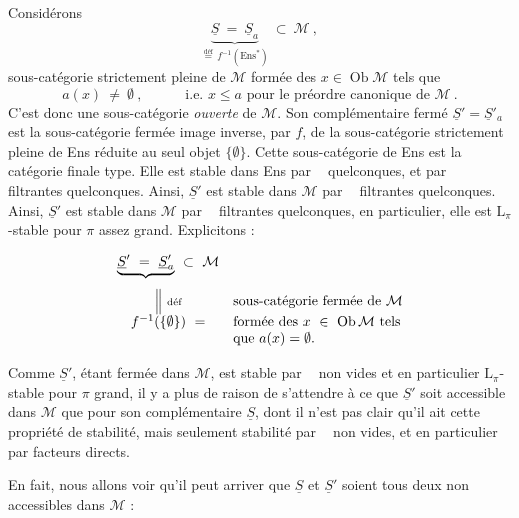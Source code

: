 \documentclass[11pt]{article}
\newcommand{\msp}[1]{\marginpar{\footnotesize [#1]}}
\newcommand{\limind}{\mathop{\underrightarrow{\mathrm{lim}}}}
\newcommand{\limproj}{\mathop{\underleftarrow{\mathrm{lim}}}}
\begin{document}
Considérons
\[
\underbrace{\underline{S}\ =\ \underline{S}_a}_{\overset{\text{déf}}{=}\,f^{-1}(\mathrm{Ens}^*)}\ \subset\ \mathcal{M}\ ,
\]
sous-catégorie strictement pleine de $\mathcal{M}$ formée des $x\in\operatorname{Ob}\mathcal{M}$ tels que
\[
a(x)\ \neq\ \emptyset\ ,\qquad\quad \text{i.e. } x\leqslant a \text{ pour le préordre canonique de } \mathcal{M}\ .
\]
C'est donc une sous-catégorie \textit{ouverte} de $\mathcal{M}$. Son complémentaire fermé $\underline{S}'=\underline{S}'_a$ est la sous-catégorie fermée image inverse, par $f$, de la sous-catégorie strictement pleine de Ens réduite au seul objet $\{\emptyset\}$. Cette sous-catégorie de Ens est la catégorie finale type. Elle est stable dans Ens par $\limind$ quelconques, et par $\limproj$ filtrantes quelconques. Ainsi, $\underline{S}'$ est stable dans $\mathcal{M}$ par $\limind$ filtrantes quelconques. Ainsi, $\underline{S}'$ est stable dans $\mathcal{M}$ par $\limind$ filtrantes quelconques, en particulier, elle est $\mathrm{L}_\pi$-stable pour $\pi$ assez grand. Explicitons :

\msp{page 13}
\[
\begin{array}{cl}
\underbrace{\underline{S}'\ =\ \underline{S}'_a}_{}\ \subset\ \mathcal{M} & \\
\Big\|\ \text{\scriptsize déf} & \text{sous-catégorie fermée de } \mathcal{M}\\
f^{-1}(\{\emptyset\})\ = & \text{formée des } x\ \in\ \operatorname{Ob}\mathcal{M} \text{ tels}\\
 & \text{que } a(x)=\emptyset.
\end{array}
\]

Comme $\underline{S}'$, étant fermée dans $\mathcal{M}$, est stable par $\limind$ non vides et en particulier $\mathrm{L}_\pi$-stable pour $\pi$ grand, il y a plus de raison de s'attendre à ce que $\underline{S}'$ soit accessible dans $\mathcal{M}$ que pour son complémentaire $\underline{S}$, dont il n'est pas clair qu'il ait cette propriété de stabilité, mais seulement stabilité par $\limproj$ non vides, et en particulier par facteurs directs.

En fait, nous allons voir qu'il peut arriver que $\underline{S}$ et $\underline{S}'$ soient tous deux non accessibles dans $\mathcal{M}$ :
\end{document}
